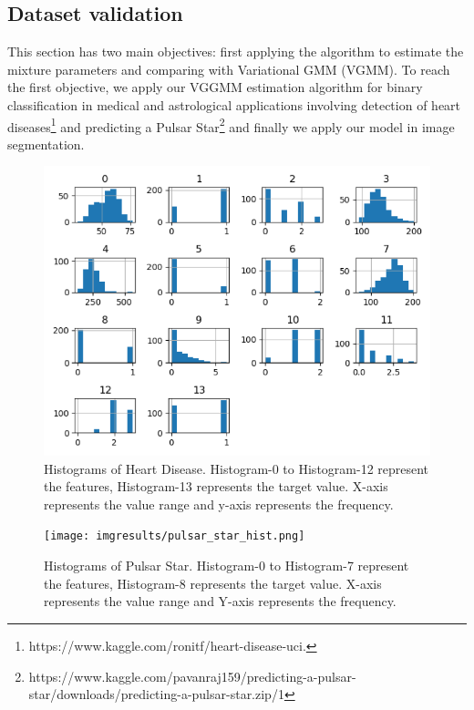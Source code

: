 \documentclass[conference]{IEEEtran}
\begin{document}
\subsection{Dataset validation}
This section has two main objectives: first applying the algorithm to estimate the mixture parameters and comparing with Variational GMM (VGMM).
To reach the first objective, we apply our VGGMM estimation algorithm for binary classification in medical and astrological applications involving
detection of heart diseases\footnote{https://www.kaggle.com/ronitf/heart-disease-uci.} and predicting a Pulsar Star\footnote{https://www.kaggle.com/pavanraj159/predicting-a-pulsar-star/downloads/predicting-a-pulsar-star.zip/1} and finally we apply our model in image segmentation.


    \begin{figure}[h!]
        \includegraphics[width=\linewidth]{heart.png}
        \caption{Histograms of Heart Disease. Histogram-0 to Histogram-12 represent the features, Histogram-13 represents the target value.
        X-axis represents the value range and y-axis represents the frequency.}
        \label{histogram of Heart Disease data}
    \end{figure}
    \begin{figure}[h!]
        \texttt{[image: imgresults/pulsar\_star\_hist.png]}
        \caption{Histograms of Pulsar Star. Histogram-0 to Histogram-7 represent the features, Histogram-8 represents the target value.
        X-axis represents the value range and Y-axis represents the frequency.}
        \label{histogram of Heart Disease data}
    \end{figure}
    
\end{document}
